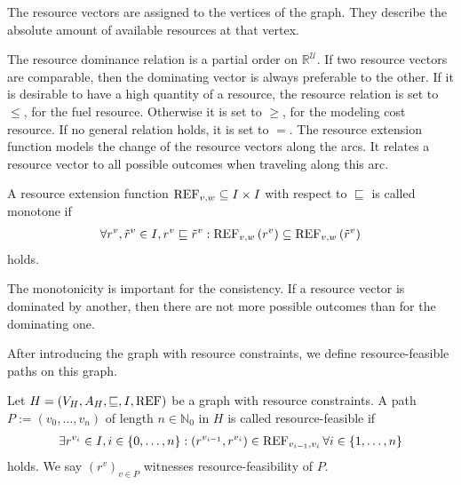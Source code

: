 The resource vectors are assigned to the vertices of the graph. They describe the absolute amount of available resources at that vertex.

The resource dominance relation is a partial order on $\mathbb{R}^{\mathcal{U}}$. If two resource vectors are comparable, then the dominating vector is always preferable to the other. If it is desirable to have a high quantity of a resource, the resource relation is set to $\leq$, \eg for the fuel resource. Otherwise it is set to $\geq$, \eg for the modeling cost resource. If no general relation holds, it is set to $=$. The resource extension function models the change of the resource vectors along the arcs. It relates a resource vector to all possible outcomes when traveling along this arc. 

\begin{definition}
\label{def:monotone_ref}

A resource extension function ${\operatorname{REF}_{v,w}\subseteq I\times I}$ with respect to $\sqsubseteq$ is called monotone if
\begin{align*}
	\forall r^v,\tilde{r}^v\in I, r^v\sqsubseteq\tilde{r}^v : \operatorname{REF}_{v,w}\left(r^v\right)\subseteq\operatorname{REF}_{v,w}\left(\tilde{r}^v\right)
\end{align*}
holds.

\end{definition}

The monotonicity is important for the consistency. If a resource vector is dominated by another, then there are not more possible outcomes than for the dominating one.

After introducing the graph with resource constraints, we define resource-feasible paths on this graph.

\begin{definition}

Let ${H=\left(V_H,A_H,\sqsubseteq,I,\operatorname{REF}\right)}$ be a graph with resource constraints. A path\linebreak
${P:=\left(v_0,\dots,v_n\right)}$ of length ${n\in\mathbb{N}_0}$ in $H$ is called resource-feasible if
\begin{align*}
	\exists r^{v_i}\in I,i\in\{0,\dots,n\}: \left(r^{v_{i-1}},r^{v_i}\right)\in\operatorname{REF}_{v_{i-1},v_i} \forall i\in\{1,\dots,n\}
\end{align*}
holds. We say $\left(r^v\right)_{v\in P}$ witnesses resource-feasibility of $P$.

\end{definition}


